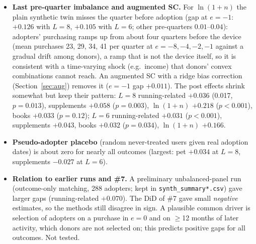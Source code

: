 \documentclass[11pt]{article}
\begin{document}
\begin{itemize}[nosep]
\item \textbf{Last pre-quarter imbalance and augmented SC.} For $\ln(1+n)$ the plain synthetic twin misses the quarter before adoption (gap at $e=-1$: $+0.126$ with $L=8$, $+0.105$ with $L=6$; other pre-quarters $0.01$--$0.04$): adopters' purchasing ramps up from about four quarters before the device (mean purchases 23, 29, 34, 41 per quarter at $e=-8,-4,-2,-1$ against a gradual drift among donors), a ramp that is not the device itself, so it is consistent with a time-varying shock (e.g.\ income) that donors' convex combinations cannot reach. An augmented SC with a ridge bias correction (Section~\ref{sec:aug}) removes it ($e=-1$ gap $+0.011$). The post effects shrink somewhat but keep their pattern: $L=8$ running-related $+0.036$ (0.017, $p=0.013$), supplements $+0.058$ ($p=0.003$), $\ln(1+n)$ $+0.218$ ($p<0.001$), books $+0.033$ ($p=0.12$); $L=6$ running-related $+0.031$ ($p<0.001$), supplements $+0.043$, books $+0.032$ ($p=0.034$), $\ln(1+n)$ $+0.166$.
\item \textbf{Pseudo-adopter placebo} (random never-treated users given real adoption dates) is about zero for nearly all outcomes (largest: pet $+0.034$ at $L=8$, supplements $-0.027$ at $L=6$).
\item \textbf{Relation to earlier runs and \#7.} A preliminary unbalanced-panel run (outcome-only matching, 288 adopters; kept in \texttt{synth\_summary*.csv}) gave larger gaps (running-related $+0.070$). The DiD of \#7 gave small \emph{negative} estimates, so the methods still disagree in sign. A plausible common driver is selection of adopters on a purchase in $e=0$ and on $\geq$12 months of later activity, which donors are not selected on; this predicts positive gaps for all outcomes. Not tested.
\end{itemize}
\end{document}
